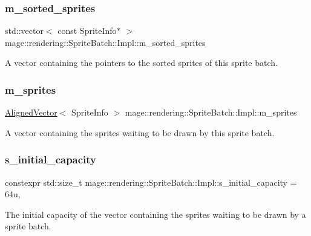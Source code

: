 \subsubsection{\texorpdfstring{m\+\_\+sorted\+\_\+sprites}{m\_sorted\_sprites}}
{\footnotesize\ttfamily std\+::vector$<$ const Sprite\+Info$\ast$ $>$ mage\+::rendering\+::\+Sprite\+Batch\+::\+Impl\+::m\+\_\+sorted\+\_\+sprites\hspace{0.3cm}{\ttfamily [private]}}

A vector containing the pointers to the sorted sprites of this sprite batch. \mbox{\label{classmage_1_1rendering_1_1_sprite_batch_1_1_impl_ad8f211053433418cf5fa6c64402936b3}} 
\subsubsection{\texorpdfstring{m\+\_\+sprites}{m\_sprites}}
{\footnotesize\ttfamily \mbox{\hyperlink{namespacemage_a8664bfb5ce2179fc64eae9f82c8a5ba8}{Aligned\+Vector}}$<$ Sprite\+Info $>$ mage\+::rendering\+::\+Sprite\+Batch\+::\+Impl\+::m\+\_\+sprites\hspace{0.3cm}{\ttfamily [private]}}

A vector containing the sprites waiting to be drawn by this sprite batch. \mbox{\label{classmage_1_1rendering_1_1_sprite_batch_1_1_impl_a3c2d72b03b49d79f91cec306e6dff1ec}} 
\subsubsection{\texorpdfstring{s\+\_\+initial\+\_\+capacity}{s\_initial\_capacity}}
{\footnotesize\ttfamily constexpr std\+::size\+\_\+t mage\+::rendering\+::\+Sprite\+Batch\+::\+Impl\+::s\+\_\+initial\+\_\+capacity = 64u\hspace{0.3cm}{\ttfamily [static]}, {\ttfamily [private]}}

The initial capacity of the vector containing the sprites waiting to be drawn by a sprite batch. 